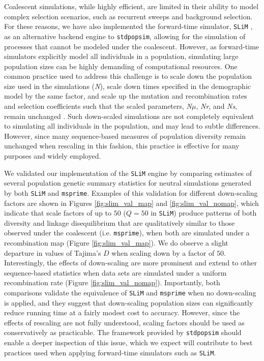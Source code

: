 \documentclass[12pt,halfline,a4paper]{ouparticle}
\begin{document}
Coalescent simulations, while highly efficient, are limited in their ability to model
complex selection scenarios, such as recurrent sweeps and background selection. For these reasons,
we have also implemented the forward-time simulator, \texttt{SLiM} \citep{haller2019tree,haller2019slim},
as an alternative backend engine to \texttt{stdpopsim}, allowing for the simulation of processes that cannot be modeled under
the coalescent. However, as forward-time simulators explicitly model all individuals in a population, simulating large
population sizes can be highly demanding of computational resources. One common practice used to address this challenge is to
scale down the population size used in the simulations (\textit{N}),
scale down times specified in the demographic model by the same factor, and scale up the mutation and recombination
rates and selection coefficients such that the scaled parameters, \textit{N$\mu$}, \textit{Nr},
and \textit{Ns}, remain unchanged \citep[see the \texttt{SLiM} manual and][]{uricchio2014robust}.
Such down-scaled simulations are not completely equivalent to simulating
all individuals in the population, and may lead to subtle differences.
However, since many sequence-based measures of population diversity remain unchanged when rescaling in this fashion,
this practice is effective for many purposes and widely employed.

We validated our implementation of the \texttt{SLiM} engine by comparing
estimates of several population genetic summary statistics for neutral simulations generated by both \texttt{SLiM}
and \texttt{msprime}.
Examples of this validation for different down-scaling factors are shown in
Figures \ref{fig:slim_val_map} and \ref{fig:slim_val_nomap}, which indicate that scale factors of up to
$50$ ($Q=50$ in \texttt{SLiM}) produce patterns of both diversity and linkage disequilibrium that are
qualitatively similar to those observed under the coalescent (i.e. \texttt{msprime}), when both are simulated under a recombination map
(Figure \ref{fig:slim_val_map}).
We do observe a slight departure in values of Tajima's $D$ when scaling down by a factor of $50$.
Interestingly, the effects of down-scaling are more prominent and extend to other sequence-based statistics
when data sets are simulated under a uniform recombination rate (Figure \ref{fig:slim_val_nomap}).
Importantly, both comparisons validate the equivalence of \texttt{SLiM} and \texttt{msprime} when no down-scaling is applied,
and they suggest that down-scaling population sizes can significantly reduce running time at a fairly modest cost to accuracy.
However, since the effects of rescaling are not fully understood, scaling factors should be used as conservatively as practicable.
The framework provided by \texttt{stdpopsim} should enable a deeper inspection of this issue, which we expect will contribute to
best practices used when applying forward-time simulators such as \texttt{SLiM}.
\end{document}
